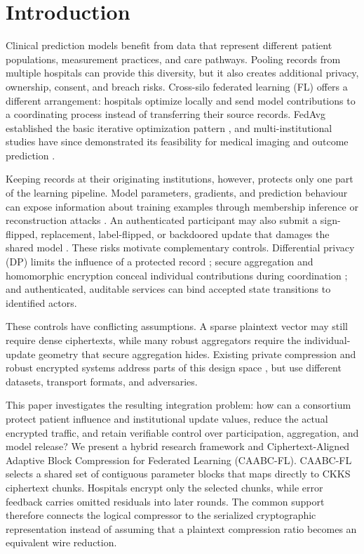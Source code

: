 \documentclass[conference]{IEEEtran}
\begin{document}
\section{Introduction}
\label{sec:introduction}
Clinical prediction models benefit from data that represent different patient
populations, measurement practices, and care pathways. Pooling records from
multiple hospitals can provide this diversity, but it also creates additional
privacy, ownership, consent, and breach risks. Cross-silo federated learning
(FL) offers a different arrangement: hospitals optimize locally and send model
contributions to a coordinating process instead of transferring their source
records. FedAvg established the basic iterative optimization pattern
\cite{mcmahan2017fedavg}, and multi-institutional studies have since demonstrated
its feasibility for medical imaging and outcome prediction
\cite{sheller2020federated,dayan2021federated}.

Keeping records at their originating institutions, however, protects only one
part of the learning pipeline. Model parameters, gradients, and prediction
behaviour can expose information about training examples through membership
inference or reconstruction attacks \cite{shokri2017membership,zhu2019dlg,
geiping2020inverting}. An authenticated participant may also submit a
sign-flipped, replacement, label-flipped, or backdoored update that damages the
shared model \cite{bagdasaryan2020backdoor,fang2020local}. These risks motivate
complementary controls. Differential privacy (DP) limits the influence of a
protected record \cite{dwork2006calibrating,abadi2016deep}; secure aggregation
and homomorphic encryption conceal individual contributions during coordination
\cite{bonawitz2017practical,cheon2017homomorphic}; and authenticated,
auditable services can bind accepted state transitions to identified actors.

These controls have conflicting assumptions. A sparse plaintext vector may
still require dense ciphertexts, while many robust aggregators require the
individual-update geometry that secure aggregation hides. Existing private
compression and robust encrypted systems address parts of this design space
\cite{li2022soteriafl,li2023fedef,asi2025preamble,xu2024ddfed,gu2025dpbrem},
but use different datasets, transport formats, and adversaries.

This paper investigates the resulting integration problem: how can a consortium
protect patient influence and institutional update values, reduce the actual
encrypted traffic, and retain verifiable control over participation,
aggregation, and model release? We present a hybrid research framework and
Ciphertext-Aligned Adaptive Block Compression for Federated Learning
(CAABC-FL). CAABC-FL selects a shared set of contiguous parameter blocks that
maps directly to CKKS ciphertext chunks. Hospitals encrypt only the selected
chunks, while error feedback carries omitted residuals into later rounds. The
common support therefore connects the logical compressor to the serialized
cryptographic representation instead of assuming that a plaintext compression
ratio becomes an equivalent wire reduction.
\end{document}
